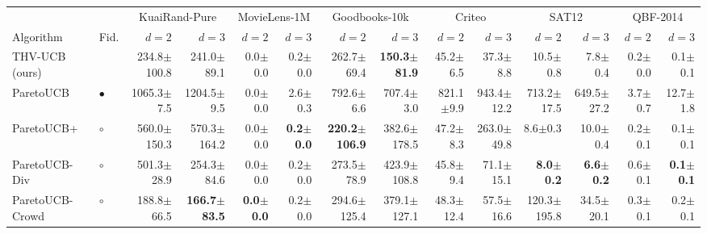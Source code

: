 \begin{tabular}{llrrrrrrrrrrrr}
\toprule
 & & \multicolumn{2}{c}{KuaiRand-Pure} & \multicolumn{2}{c}{MovieLens-1M} & \multicolumn{2}{c}{Goodbooks-10k} & \multicolumn{2}{c}{Criteo} & \multicolumn{2}{c}{SAT12} & \multicolumn{2}{c}{QBF-2014}\\
\cmidrule(lr){3-4}\cmidrule(lr){5-6}\cmidrule(lr){7-8}\cmidrule(lr){9-10}\cmidrule(lr){11-12}\cmidrule(lr){13-14}
Algorithm & Fid. & $d=2$ & $d=3$ & $d=2$ & $d=3$ & $d=2$ & $d=3$ & $d=2$ & $d=3$ & $d=2$ & $d=3$ & $d=2$ & $d=3$\\
\midrule
THV-UCB (ours) &  & 234.8{\scriptsize$\pm$100.8} & 241.0{\scriptsize$\pm$89.1} & 0.0{\scriptsize$\pm$0.0} & 0.2{\scriptsize$\pm$0.0} & 262.7{\scriptsize$\pm$69.4} & \textbf{150.3{\scriptsize$\pm$81.9}} & 45.2{\scriptsize$\pm$6.5} & 37.3{\scriptsize$\pm$8.8} & 10.5{\scriptsize$\pm$0.8} & 7.8{\scriptsize$\pm$0.4} & 0.2{\scriptsize$\pm$0.0} & 0.1{\scriptsize$\pm$0.1}\\
\midrule
ParetoUCB & $\bullet$ & 1065.3{\scriptsize$\pm$7.5} & 1204.5{\scriptsize$\pm$9.5} & 0.0{\scriptsize$\pm$0.0} & 2.6{\scriptsize$\pm$0.3} & 792.6{\scriptsize$\pm$6.6} & 707.4{\scriptsize$\pm$3.0} & 821.1{\scriptsize$\pm$9.9} & 943.4{\scriptsize$\pm$12.2} & 713.2{\scriptsize$\pm$17.5} & 649.5{\scriptsize$\pm$27.2} & 3.7{\scriptsize$\pm$0.7} & 12.7{\scriptsize$\pm$1.8}\\
ParetoUCB+ & $\circ$ & 560.0{\scriptsize$\pm$150.3} & 570.3{\scriptsize$\pm$164.2} & 0.0{\scriptsize$\pm$0.0} & \textbf{0.2{\scriptsize$\pm$0.0}} & \textbf{220.2{\scriptsize$\pm$106.9}} & 382.6{\scriptsize$\pm$178.5} & 47.2{\scriptsize$\pm$8.3} & 263.0{\scriptsize$\pm$49.8} & 8.6{\scriptsize$\pm$0.3} & 10.0{\scriptsize$\pm$0.4} & 0.2{\scriptsize$\pm$0.1} & 0.1{\scriptsize$\pm$0.1}\\
ParetoUCB-Div & $\circ$ & 501.3{\scriptsize$\pm$28.9} & 254.3{\scriptsize$\pm$84.6} & 0.0{\scriptsize$\pm$0.0} & 0.2{\scriptsize$\pm$0.0} & 273.5{\scriptsize$\pm$78.9} & 423.9{\scriptsize$\pm$108.8} & 45.8{\scriptsize$\pm$9.4} & 71.1{\scriptsize$\pm$15.1} & \textbf{8.0{\scriptsize$\pm$0.2}} & \textbf{6.6{\scriptsize$\pm$0.2}} & 0.6{\scriptsize$\pm$0.1} & \textbf{0.1{\scriptsize$\pm$0.1}}\\
ParetoUCB-Crowd & $\circ$ & 188.8{\scriptsize$\pm$66.5} & \textbf{166.7{\scriptsize$\pm$83.5}} & \textbf{0.0{\scriptsize$\pm$0.0}} & 0.2{\scriptsize$\pm$0.0} & 294.6{\scriptsize$\pm$125.4} & 379.1{\scriptsize$\pm$127.1} & 48.3{\scriptsize$\pm$12.4} & 57.5{\scriptsize$\pm$16.6} & 120.3{\scriptsize$\pm$195.8} & 34.5{\scriptsize$\pm$20.1} & 0.3{\scriptsize$\pm$0.1} & 0.2{\scriptsize$\pm$0.1}\\

\end{tabular}
